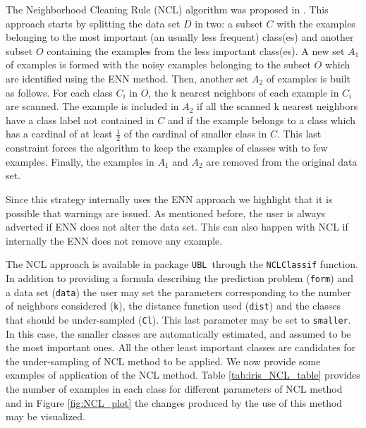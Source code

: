 \documentclass[10pt,a4paper]{article}\usepackage[]{graphicx}\usepackage[]{color}
\newcommand{\UBL}{package \texttt{UBL}\ }
\begin{document}
The Neighborhood Cleaning Rule (NCL) algorithm was proposed in \cite{laurikkala2001improving}. This approach starts by splitting the data set $D$ in two: a subset $C$ with the examples belonging to the most important (an usually less frequent) class(es) and another subset $O$ containing the examples from the less important class(es). A new set $A_1$ of examples is formed with the noisy examples belonging to the subset $O$ which are identified using the ENN method.
Then, another set $A_2$ of examples is built as follows. For each class $C_i$ in $O$, the k nearest neighbors of each example in $C_i$ are scanned. The example is included in $A_2$ if all the scanned k nearest neighbors have a class label not contained in $C$ and if the example belongs to a class which has a cardinal of at least $\frac{1}{2}$ of the cardinal of smaller class in $C$. This last constraint forces the algorithm to keep the examples of classes with to few examples.
Finally, the examples in $A_1$ and $A_2$ are removed from the original data set.

Since this strategy internally uses the ENN approach we highlight that it is possible that warnings are issued. As mentioned before, the user is always adverted if ENN does not alter the data set. This can also happen with NCL if internally the ENN does not remove any example.

The NCL approach is available in \UBL through the \texttt{NCLClassif} function. In addition to providing a formula describing the prediction problem (\texttt{form}) and a data set (\texttt{data}) the user may set the parameters corresponding to the number of neighbors considered (\texttt{k}), the distance function used (\texttt{dist}) and the classes that should be under-sampled (\texttt{Cl}). This last parameter may be set to \texttt{smaller}. In this case, the smaller classes are automatically estimated, and assumed to be the most important ones. All the other least important classes are candidates for the under-sampling of NCL method to be applied. We now provide some examples of application of the NCL method. Table \ref{tab:iris_NCL_table} provides the number of examples in each class for different parameters of NCL method and in Figure \ref{fig:NCL_plot} the changes produced by the use of this method may be visualized.
\end{document}
